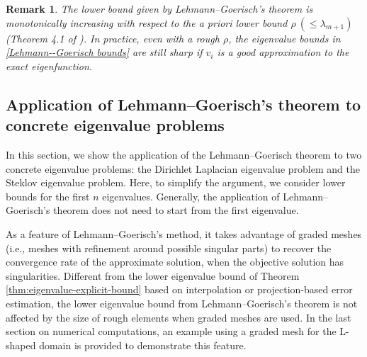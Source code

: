 \documentclass[a4,11pt]{article}
\numberwithin{equation}{section}
\newtheorem{remark}[theorem]{Remark}
\begin{document}
\medskip

\begin{remark} The lower bound given by Lehmann--Goerisch's theorem is monotonically increasing with respect to the {\rm a priori} lower bound $\rho~ (\le \lambda_{m+1})$ (Theorem 4.1 of \cite{Beattie+Goerisch1995}).
In practice, even with a rough $\rho$,
the eigenvalue bounds in \cref{Lehmann--Goerisch bounds} are still sharp if
$v_i$ is a good approximation to the exact eigenfunction.
\end{remark}

 
\subsection{Application of Lehmann--Goerisch's theorem to concrete eigenvalue problems}
    In this section, we show the application of the Lehmann--Goerisch theorem to two concrete eigenvalue problems: the Dirichlet Laplacian eigenvalue problem and the Steklov eigenvalue problem. Here, to  simplify the argument, we consider  lower bounds for the first $n$ eigenvalues. Generally, the application of Lehmann--Goerisch's theorem does not need to start from the first eigenvalue.

As a feature of Lehmann--Goerisch's method, it takes advantage of  graded meshes (i.e., meshes with refinement around possible singular parts) to recover the convergence rate of the approximate solution, when the objective solution has singularities.
 Different from the lower eigenvalue bound of Theorem \ref{thm:eigenvalue-explicit-bound} based on interpolation or projection-based error  estimation, the lower eigenvalue bound from Lehmann--Goerisch's theorem is not affected by the size of rough  elements when graded meshes are used.
 In the last section on numerical computations, an example using a graded mesh for the L-shaped domain is provided to demonstrate this feature.
 
 \medskip
	     
\end{document}
